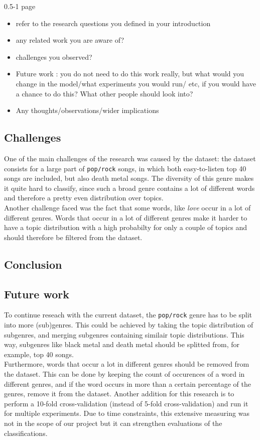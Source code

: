 0.5-1 page
\begin{itemize}
\item refer to the research questions you defined in your introduction
\item any related work you are aware of?
\item challenges you observed?
\item Future work : you do not need to do this work really, but what would you change in the model/what experiments you would run/ etc, if you would have a chance to do this? What other people should look into?
\item Any thoughts/observations/wider implications
\end{itemize}

\subsection{Challenges}
One of the main challenges of the research was caused by the dataset: the dataset consists for a large part of \verb|pop/rock| songs, in which both easy-to-listen top 40 songs are included, but also death metal songs. The diversity of this genre makes it quite hard to classify, since such a broad genre contains a lot of different words and therefore a pretty even distribution over topics. \\
Another challenge faced was the fact that some words, like \textit{love} occur in a lot of different genres. Words that occur in a lot of different genres make it harder to have a topic distribution with a high probabilty for only a couple of topics and should therefore be filtered from the dataset. 

\subsection{Conclusion}

\subsection{Future work}
To continue reseach with the current dataset, the \verb|pop/rock| genre has to be split into more (sub)genres. This could be achieved by taking the topic distribution of subgenres, and merging subgenres containing similair topic distributions. This way, subgenres like black metal and death metal should be splitted from, for example, top 40 songs. \\
Furthermore, words that occur a lot in different genres should be removed from the dataset. This can be done by keeping the count of occurences of a word in different genres, and if the word occurs in more than a certain percentage of the genres, remove it from the dataset.
Another addition for this research is to perform a 10-fold cross-validation (instead of 5-fold cross-validation) and run it for multiple experiments. Due to time constraints, this extensive measuring was not in the scope of our project but it can strengthen evaluations of the classifications.